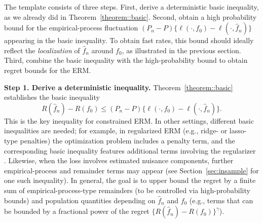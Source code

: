\documentclass[11pt]{article}
\theoremstyle{plain}
\theoremstyle{definition} %
\begin{document}
The template consists of three steps. First, derive a deterministic basic
inequality, as we already did in Theorem~\ref{theorem::basic}. Second, obtain a high probability bound for the empirical-process fluctuation \((P_n-P)\{\ell(\cdot,f_0)-\ell(\cdot,\hat f_n)\}\) appearing in the basic
inequality. To obtain fast rates, this bound should ideally reflect the
\emph{localization} of \(\hat f_n\) around \(f_0\), as illustrated in the
previous section. Third, combine the basic inequality with
the high-probability bound to obtain regret bounds for the ERM.



\noindent \textbf{Step 1. Derive a deterministic inequality.}
Theorem~\ref{theorem::basic} establishes the basic inequality
\begin{equation}
R(\hat f_n)-R(f_0)
\le
(P_n-P)\bigl\{\ell(\cdot,f_0)-\ell(\cdot,\hat f_n)\bigr\}.
\label{eqn::basicgen}
\end{equation}
This is the key inequality for constrained ERM. In other settings, different
basic inequalities are needed; for example, in regularized ERM (e.g., ridge- or
lasso-type penalties) the optimization problem includes a penalty term, and the
corresponding basic inequality features additional terms involving the
regularizer \citep{wainwright2019high}. Likewise, when the loss involves
estimated nuisance components, further empirical-process and remainder terms may
appear (see Section~\ref{sec:insample} for one such inequality). In general, the
goal is to upper bound the regret by a finite sum of empirical-process-type
remainders (to be controlled via high-probability bounds) and population
quantities depending on \(\hat f_n\) and \(f_0\) (e.g., terms that can be bounded
by a fractional power of the regret \(\{R(\hat f_n)-R(f_0)\}^{\gamma}\)).
\end{document}
